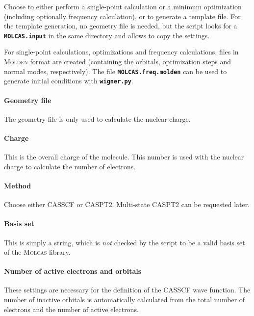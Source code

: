 \documentclass[a4paper,10pt,DIV=15,openany,twoside=false]{scrbook}
\newcommand{\ttt}[1]{\textbf{\texttt{#1}}}
\begin{document}
Choose to either perform a single-point calculation or a minimum optimization (including optionally frequency calculation), or to generate a template file. For the template generation, no geometry file is needed, but the script looks for a \ttt{MOLCAS.input} in the same directory and allows to copy the settings. 

For single-point calculations, optimizations and frequency calculations, files in \textsc{Molden} format are created (containing the orbitals, optimization steps and normal modes, respectively). The file \ttt{MOLCAS.freq.molden} can be used to generate initial conditions with \ttt{wigner.py}.

\paragraph{Geometry file}

The geometry file is only used to calculate the nuclear charge.

\paragraph{Charge}

This is the overall charge of the molecule. This number is used with the nuclear charge to calculate the number of electrons.

\paragraph{Method}

Choose either CASSCF or CASPT2. Multi-state CASPT2 can be requested later.

\paragraph{Basis set}

This is simply a string, which is \textit{not} checked by the script to be a valid basis set of the \textsc{Molcas} library.

\paragraph{Number of active electrons and orbitals}

These settings are necessary for the definition of the CASSCF wave function. The number of inactive orbitals is automatically calculated from the total number of electrons and the number of active electrons.
\end{document}
